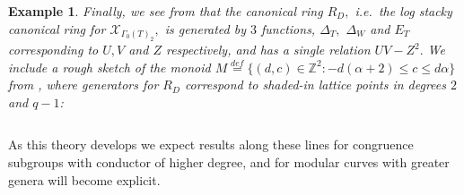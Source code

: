 \documentclass[11pt]{amsart}
\newtheorem{example}[theorem]{Example}
\theoremstyle{definition}
\numberwithin{equation}{section}
\newcommand{\sX}{\mathscr{X}}		%
\newcommand{\bbZ}{\mathbb{Z}}		%
\begin{document}
\begin{example}
	Finally, we see from \cite[Theorem $6$]{ODorney-canonical-rings-Q-divisors-on-P1} that the canonical ring $R_D,$ i.e.\ the log stacky canonical ring for $\sX_{\Gamma_0(T)_2},$ is generated by $3$ functions, $\Delta_T,$ $\Delta_W$ and $E_T$ corresponding to $U,V$ and $Z$ respectively, and has a single relation $UV-Z^2.$ We include a rough sketch of the monoid $M\overset{def}{=}\{(d,c)\in \bbZ^2:-d(\alpha+2)\leq c\leq d\alpha\}$ from \cite{ODorney-canonical-rings-Q-divisors-on-P1}, where generators for $R_D$ correspond to shaded-in lattice points in degrees $2$ and $q-1$:\\
	
	\begin{figure}[!h]\centering{}\end{figure}$~$\\
\end{example}


As this theory develops we expect results along these lines for congruence subgroups with conductor of higher degree, and for modular curves with greater genera will become explicit. 


\newpage
\end{document}
